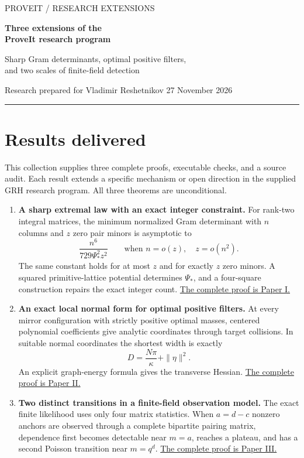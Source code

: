 \documentclass[11pt]{article}
\newcommand{\PsiStar}{\Psi_*}
\newcommand{\guideheading}[1]{\section*{\color{ink}#1}\addcontentsline{toc}{section}{#1}}
\begin{document}
{\color{accent}\large PROVEIT \quad / \quad RESEARCH EXTENSIONS}\par
\vspace{9pt}
{\color{ink}\Huge\bfseries Three extensions of the\\[3pt] ProveIt research program}\par
\vspace{8pt}
{\large Sharp Gram determinants, optimal positive filters,\\
and two scales of finite-field detection}\par
\vspace{10pt}
Research prepared for Vladimir Reshetnikov \hfill 27 November 2026

{\color{accent}\rule{\linewidth}{1pt}}

\guideheading{Results delivered}
This collection supplies three complete proofs, executable checks, and a source audit.
Each result extends a specific mechanism or open direction in the supplied GRH
research program. All three theorems are unconditional.

\begin{enumerate}
\item \textbf{A sharp extremal law with an exact integer constraint.}
For rank-two integral matrices, the minimum normalized Gram determinant with
$n$ columns and $z$ zero pair minors is asymptotic to
\[
 \frac{n^6}{729\PsiStar^2z^2}
 \qquad\text{when }n=o(z),\quad z=o(n^2).
\]
The same constant holds for at most $z$ and for exactly $z$ zero minors.
A squared primitive-lattice potential determines $\PsiStar$, and a four-square
construction repairs the exact integer count.
\hyperref[paper:gram]{The complete proof is Paper I.}

\item \textbf{An exact local normal form for optimal positive filters.}
At every mirror configuration with strictly positive optimal masses, centered
polynomial coefficients give analytic coordinates through target collisions.
In suitable normal coordinates the shortest width is exactly
\[
 D=\frac{N\pi}{\kappa}+\|\eta\|^2.
\]
An explicit graph-energy formula gives the transverse Hessian.
\hyperref[paper:filters]{The complete proof is Paper II.}

\item \textbf{Two distinct transitions in a finite-field observation model.}
The exact finite likelihood uses only four matrix statistics. When $a=d-c$
nonzero anchors are observed through a complete bipartite pairing matrix,
dependence first becomes detectable near $m=a$, reaches a plateau, and
has a second Poisson transition near $m=q^d$.
\hyperref[paper:detection]{The complete proof is Paper III.}
\end{enumerate}
\end{document}

